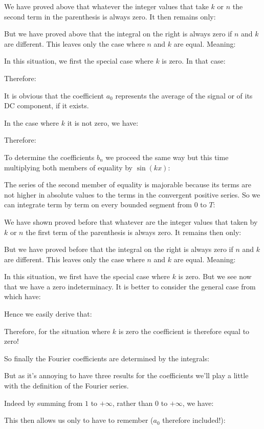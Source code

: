 	We have proved above that whatever the integer values that take $k$ or $n$ the second term in the parenthesis is always zero. It then remains only:
	
	But we have proved above that the integral on the right is always zero if $n$ and $k$ are different. This leaves only the case where $n$ and $k$ are equal. Meaning:
	
	In this situation, we first the special case where $k$ is zero. In that case:
	
	Therefore:
	
	It is obvious that the coefficient $a_0$ represents the average of the signal or of its DC component, if it exists.
	
	In the case where $k$ it is not zero, we have:
	
	Therefore:
	
	To determine the coefficients $b_n$ we proceed the same way but this time multiplying both members of equality by $\sin(kx)$:
	
	The series of the second member of equality is majorable because its terms are not higher in absolute values to the terms in the convergent positive series. So we can integrate term by term on every bounded segment from $0$ to $T$:
	
	We have shown proved before that whatever are the integer values that taken by $k$ or $n$ the first term of the parenthesis is always zero. It remains then only:
	
	
	But we have proved before that the integral on the right is always zero if $n$ and $k$ are different. This leaves only the case where $n$ and $k$ are equal. Meaning:
	
	In this situation, we first have the special case where $k$ is zero. But we see now that we have a zero indeterminacy. It is better to consider the general case from which have:
	
	Hence we easily derive that:
	
	Therefore, for the situation where $k$ is zero the coefficient is therefore equal to zero!
	
	So finally the Fourier coefficients are determined by the integrals:
	
	But as it's annoying to have three results for the coefficients we'll play a little with the definition of the Fourier series.
	
	Indeed by summing from $1$ to $+\infty$, rather than $0$ to $+\infty$, we have:
	
	This then allows us only to have to remember ($a_0$ therefore included!):
	
